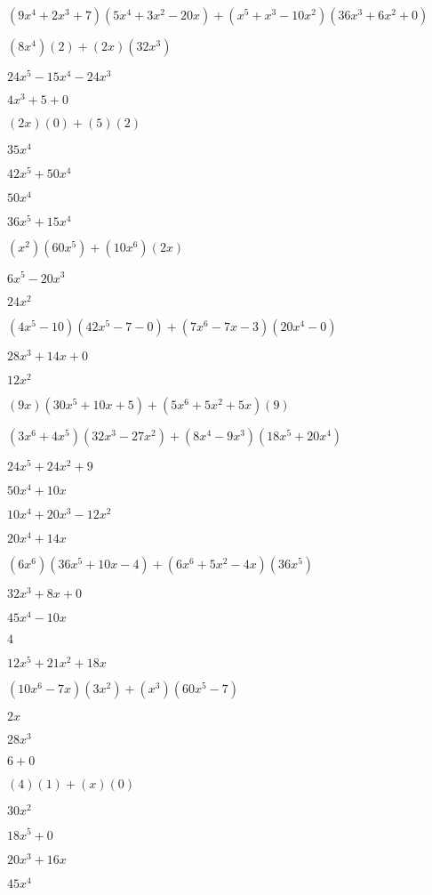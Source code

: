 \documentclass{article}
\begin{document}
\begin{multicols}{2}
$(9x^{4}+2x^{3}+7)(5x^{4}+3x^{2}-20x)+(x^{5}+x^{3}-10x^2)(36x^{3}+6x^{2}+0)$\item $(8x^{4})(2)+(2x)(32x^{3})$\item $24x^{5}-15x^{4}-24x^{3}$\item $4x^{3}+5+0$\item $(2x)(0)+(5)(2)$\item $35x^{4}$\item $42x^{5}+50x^{4}$\item $50x^{4}$\item $36x^{5}+15x^{4}$\item $(x^2)(60x^{5})+(10x^{6})(2x)$\item $6x^{5}-20x^{3}$\item $24x^{2}$\item $(4x^{5}-10)(42x^{5}-7-0)+(7x^{6}-7x-3)(20x^{4}-0)$\item $28x^{3}+14x+0$\item $12x^{2}$\item $(9x)(30x^{5}+10x+5)+(5x^{6}+5x^2+5x)(9)$\item $(3x^{6}+4x^{5})(32x^{3}-27x^{2})+(8x^{4}-9x^{3})(18x^{5}+20x^{4})$\item $24x^{5}+24x^{2}+9$\item $50x^{4}+10x$\item $10x^{4}+20x^{3}-12x^{2}$\item $20x^{4}+14x$\item $(6x^{6})(36x^{5}+10x-4)+(6x^{6}+5x^2-4x)(36x^{5})$\item $32x^{3}+8x+0$\item $45x^{4}-10x$\item $4$\item $12x^{5}+21x^{2}+18x$\item $(10x^{6}-7x)(3x^{2})+(x^{3})(60x^{5}-7)$\item $2x$\item $28x^{3}$\item $6+0$\item $(4)(1)+(x)(0)$\item $30x^{2}$\item $18x^{5}+0$\item $20x^{3}+16x$\item $45x^{4}$\item 
\end{multicols}
\end{document}
